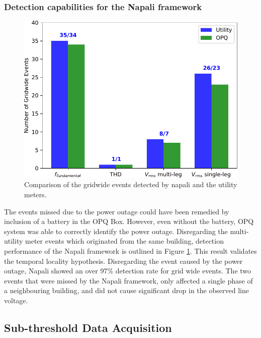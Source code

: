 \subsubsection{Detection capabilities for the Napali framework}
\begin{figure}[!ht]
    \centering
    \includegraphics[width=0.9\linewidth]{img/napali_eval/gt/money_plot1.pdf}
    \caption{Comparison of the gridwide events detected by napali and the utility meters.}
    \label{expdes:fig:gt_money}
\end{figure}

The events missed due to the power outage could have been remedied by inclusion of a battery in the OPQ Box.
However, even without the battery, OPQ system was able to correctly identify the power outage.
Disregarding the multi-utility meter events which originated from the same building, detection performance of the Napali framework is outlined in Figure \ref{expdes:fig:gt_money}.
This result validates the temporal locality hypothesis.
Disregarding the event caused by the power outage, Napali showed an over 97\% detection rate for grid wide events.
The two events that were missed by the Napali framework, only affected a single phase of a neighbouring building, and did not cause significant drop in the observed line voltage.

\subsection{Sub-threshold Data Acquisition}\label{subsec:sub-threshold-data-acquisition}

